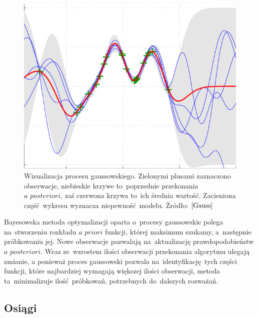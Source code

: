 \documentclass[declaration,shortabstract,inz]{iithesis}
\begin{document}
\begin{figure}[H]
	\centering
	\captionsetup{format=hang}
	\includegraphics[width=\textwidth,height=\textheight,keepaspectratio]{Gauss.png}
	\caption[Caption]{Wizualizacja procesu gaussowskiego. Zielonymi plusami zaznaczono obserwacje, niebieskie krzywe to~poprzednie przekonania $\textit{a posteriori}$, zaś czerwona krzywa to~ich średnia wartość. Zacieniona część wykresu wyznacza niepewność modelu. Żródło: $\cite{Gauss}$}
	\label{fig:Gauss}
\end{figure}

Bayesowska metoda optymalizacji oparta o~procesy gaussowskie polega na~stworzeniu rozkładu $\textit{a priori}$ funkcji, której maksimum szukamy, a~następnie próbkowaniu jej. Nowe obserwacje pozwalają na~aktualizację prawdopodobieństw $\textit{a posteriori}$. Wraz ze~wzrostem ilości obserwacji przekonania algorytmu ulegają zmianie, a ponieważ proces gaussowski pozwala na~identyfikację tych części funkcji, które najbardziej wymagają większej ilości obserwacji, metoda ta~minimalizuje ilość próbkowań, potrzebnych do~dalszych rozważań.

\subsection*{Osiągi}
\end{document}
